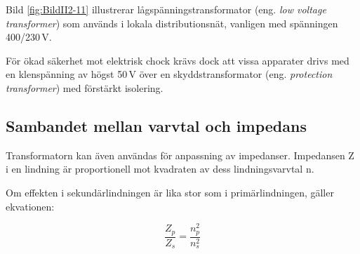Bild \ref{fig:BildII2-11} illustrerar lågspänningstransformator (eng.
\emph{low voltage transformer}) som används i lokala distributionsnät,
vanligen med spänningen 400/230\,V.

För ökad säkerhet mot elektrisk chock krävs dock att vissa
apparater drivs med en klenspänning av högst 50\,V över en 
skyddstransformator (eng. \emph{protection transformer}) med förstärkt
isolering.

\subsection{Sambandet mellan varvtal och impedans}

Transformatorn kan även användas för anpassning av impedanser.
Impedansen Z i en lindning är proportionell mot kvadraten av dess
lindningsvarvtal n.

Om effekten i sekundärlindningen är lika stor som i primärlindningen, gäller
ekvationen:

\[\frac{Z_p}{Z_s} = \frac{n_p^2}{n_s^2}\]

